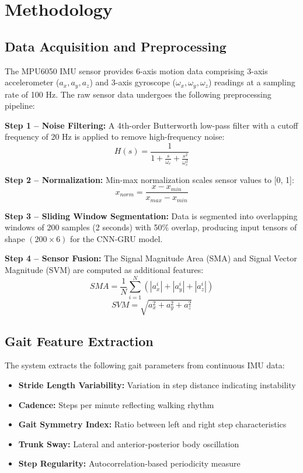 \documentclass[conference]{IEEEtran}
\begin{document}
\section{Methodology}

\subsection{Data Acquisition and Preprocessing}

The MPU6050 IMU sensor provides 6-axis motion data comprising 3-axis accelerometer ($a_x, a_y, a_z$) and 3-axis gyroscope ($\omega_x, \omega_y, \omega_z$) readings at a sampling rate of 100 Hz. The raw sensor data undergoes the following preprocessing pipeline:

\textbf{Step 1 -- Noise Filtering:} A 4th-order Butterworth low-pass filter with a cutoff frequency of 20 Hz is applied to remove high-frequency noise:
\begin{equation}
    H(s) = \frac{1}{1 + \frac{s}{\omega_c} + \frac{s^2}{\omega_c^2}}
\end{equation}

\textbf{Step 2 -- Normalization:} Min-max normalization scales sensor values to [0, 1]:
\begin{equation}
    x_{norm} = \frac{x - x_{min}}{x_{max} - x_{min}}
\end{equation}

\textbf{Step 3 -- Sliding Window Segmentation:} Data is segmented into overlapping windows of 200 samples (2 seconds) with 50\% overlap, producing input tensors of shape $(200 \times 6)$ for the CNN-GRU model.

\textbf{Step 4 -- Sensor Fusion:} The Signal Magnitude Area (SMA) and Signal Vector Magnitude (SVM) are computed as additional features:
\begin{equation}
    SMA = \frac{1}{N}\sum_{i=1}^{N}(|a_x^i| + |a_y^i| + |a_z^i|)
\end{equation}
\begin{equation}
    SVM = \sqrt{a_x^2 + a_y^2 + a_z^2}
\end{equation}

\subsection{Gait Feature Extraction}

The system extracts the following gait parameters from continuous IMU data:
\begin{itemize}
    \item \textbf{Stride Length Variability:} Variation in step distance indicating instability
    \item \textbf{Cadence:} Steps per minute reflecting walking rhythm
    \item \textbf{Gait Symmetry Index:} Ratio between left and right step characteristics
    \item \textbf{Trunk Sway:} Lateral and anterior-posterior body oscillation
    \item \textbf{Step Regularity:} Autocorrelation-based periodicity measure
\end{itemize}
\end{document}
